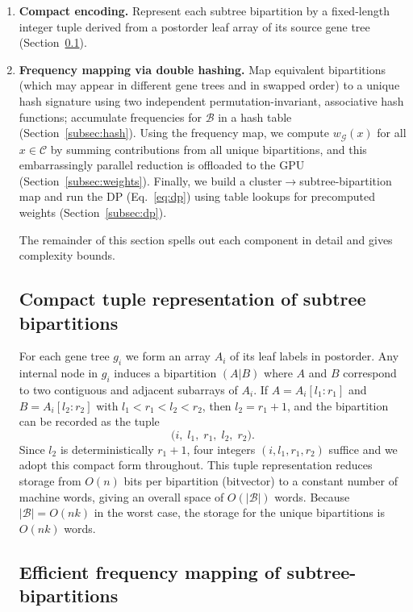 \documentclass[10pt,a4paper]{article}
\begin{document}
\begin{enumerate}
  \item \textbf{Compact encoding.} Represent each subtree bipartition by a fixed-length integer tuple derived from a postorder leaf array of its source gene tree (Section~\ref{subsec:tuple}).
  \item \textbf{Frequency mapping via double hashing.} Map equivalent bipartitions (which may appear in different gene trees and in swapped order) to a unique hash signature using two independent permutation-invariant, associative hash functions; accumulate frequencies for $\mathcal{B}$ in a hash table (Section~\ref{subsec:hash}).
Using the frequency map, we compute $w_{\mathcal{G}}(x)$ for all $x\in\mathcal{C}$ by summing contributions from all unique bipartitions, and this embarrassingly parallel reduction is offloaded to the GPU (Section~\ref{subsec:weights}).
Finally, we build a cluster$\to$subtree-bipartition map and run the DP (Eq.~\ref{eq:dp}) using table lookups for precomputed weights (Section~\ref{subsec:dp}).


The remainder of this section spells out each component in detail and gives complexity bounds.

\subsection{Compact tuple representation of subtree bipartitions}
\label{subsec:tuple}

For each gene tree $g_i$ we form an array $A_i$ of its leaf labels in postorder. Any internal node in $g_i$ induces a bipartition $(A\!|\!B)$ where $A$ and $B$ correspond to two contiguous and adjacent subarrays of $A_i$. If $A=A_{i}[l_1:r_1]$ and $B=A_{i}[l_2:r_2]$ with $l_1<r_1<l_2<r_2$, then $l_2=r_1+1$, and the bipartition can be recorded as the tuple
\[
\big(i,\; l_1,\; r_1,\; l_2,\; r_2\big).
\]
Since $l_2$ is deterministically $r_1+1$, four integers $(i,l_1,r_1,r_2)$ suffice and we adopt this compact form throughout. This tuple representation reduces storage from $O(n)$ bits per bipartition (bitvector) to a constant number of machine words, giving an overall space of $O(|\mathcal{B}|)$ words. Because $|\mathcal{B}|=O(nk)$ in the worst case, the storage for the unique bipartitions is $O(nk)$ words.


\subsection*{Efficient frequency mapping of subtree-bipartitions}


\end{enumerate}
\end{document}
